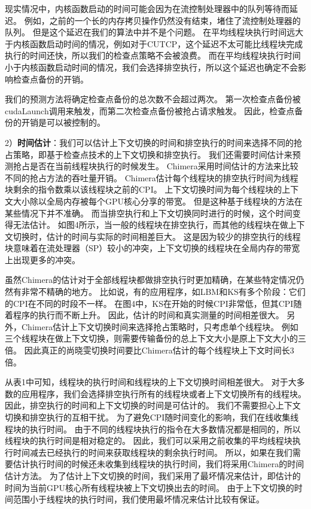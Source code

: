 现实情况中，内核函数启动的时间可能会因为在流控制处理器中的队列等待而延迟。
例如，之前的一个长的内存拷贝操作仍然没有结束，堵住了流控制处理器的队列。
但是这个延迟在我们的算法中并不是个问题。
在平均线程块执行时间远大于内核函数启动时间的情况，例如对于CUTCP，这个延迟不太可能比线程块完成执行的时间还快，所以我们的检查点策略不会被浪费。
而在平均线程块执行时间小于内核函数启动时间的情况，我们会选择排空执行，所以这个延迟也确定不会影响检查点备份的开销。

我们的预测方法将确定检查点备份的总次数不会超过两次。
第一次检查点备份被cudaLaunch调用来触发，而第二次检查点备份被抢占请求触发。
因此，检查点备份的开销是可以被控制的。

2）\textbf{时间估计}：我们可以估计上下文切换的时间和排空执行的时间来选择不同的抢占策略，即基于检查点技术的上下文切换和排空执行。
我们还需要时间估计来预测抢占是否在当前线程块执行的时候发生。
Chimera采用时间估计的方法来比较不同的抢占方法的吞吐量开销。
Chimera估计每个线程块的排空执行时间为线程块剩余的指令数乘以该线程块之前的CPI。
上下文切换时间为每个线程块的上下文大小除以全局内存被每个GPU核心分享的带宽。
但是这种基于线程块的方法在某些情况下并不准确。
而当排空执行和上下文切换同时进行的时候，这个时间变得无法估计。
如图4所示，当一般的线程块在排空执行，而其他的线程块在做上下文切换时，估计的时间与实际的时间相差巨大。
这是因为较少的排空执行的线程块意味着在流处理器（SP）较小的冲突，上下文切换的线程块在全局内存的带宽上出现更多的冲突。

虽然Chimera的估计对于全部线程块都做排空执行时更加精确，在某些特定情况仍然有非常不精确的地方。
比如说，有的应用程序，如LBM和KS有多个阶段：它们的CPI在不同的时段不一样。
在图4中，KS在开始的时候CPI非常低，但其CPI随着程序的执行而不断上升。
因此，估计的时间和真实测量的时间相差很大。
另外，Chimera估计上下文切换时间来选择抢占策略时，只考虑单个线程块。
例如三个线程块在做上下文切换，则需要传输备份的总上下文大小是原上下文大小的三倍。
因此真正的尚晓雯切换时间要比Chimera估计的每个线程块上下文时间长3倍。

从表1中可知，线程块的执行时间和线程块的上下文切换时间相差很大。
对于大多数的应用程序，我们会选择排空执行所有的线程块或者上下文切换所有的线程块。
因此，排空执行的时间和上下文切换的时间是可估计的。
我们不需要担心上下文切换和排空执行的互相干扰。
为了避免CPI随时间变化的影响，我们在线收集线程块的执行时间。
由于不同的线程块执行的指令在大多数情况都是相同的，所以线程块的执行时间是相对稳定的。
因此，我们可以采用之前收集的平均线程块执行时间减去已经执行的时间来获取线程块的剩余执行时间。
所以，如果在我们需要估计执行时间的时候还未收集到线程块的执行时间，我们将采用Chimera的时间估计方法。
为了估计上下文切换的时间，我们采用了最坏情况来估计，即估计的时间为当前GPU核心所有线程块被上下文切换出去的时间。
由于上下文切换的时间范围小于线程块的执行时间，我们使用最坏情况来估计比较有保证。


